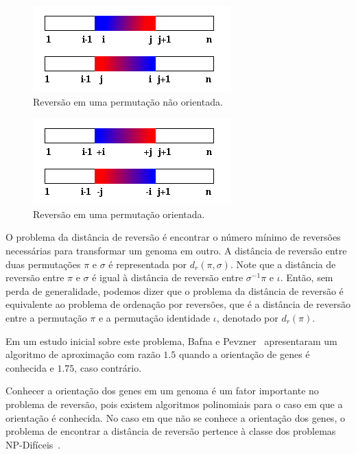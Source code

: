 \begin{figure}[h]
  \centering
  \includegraphics{images/rev_nao_orientada-color.png} 
  \caption{Reversão em uma permutação não orientada.}
  \label{fig:rev_nao_orientada}
\end{figure}

\begin{figure}[h]
  \centering
  \includegraphics{images/rev_orientada-color.png}
  \caption{Reversão em uma permutação orientada.}
  \label{fig:rev_orientada}
\end{figure}

O problema da distância de reversão é encontrar o número mínimo de
reversões necessárias para transformar um genoma em outro. A distância
de reversão entre duas permutações $\pi$ e $\sigma$ é representada por
$d_{r}(\pi,\sigma)$. Note que a distância de reversão entre $\pi$ e
$\sigma$ é igual à distância de reversão entre $\sigma^{-1} \pi$ e
$\iota$. Então, sem perda de generalidade, podemos dizer que o problema
da distância de reversão é equivalente ao problema de ordenação por
reversões, que é a distância de reversão entre a permutação $\pi$ e a
permutação identidade $\iota$, denotado por $d_{r}(\pi)$.

Em um estudo inicial sobre este problema, Bafna e
Pevzner~\cite{BafnaPevzner*1996} apresentaram um algoritmo de
aproximação com razão $1.5$ quando a orientação de genes é conhecida e
$1.75$, caso contrário.

Conhecer a orientação dos genes em um genoma é um fator importante no
problema de reversão, pois existem algoritmos polinomiais para o caso em
que a orientação é conhecida. No caso em que não se conhece a orientação
dos genes, o problema de encontrar a distância de reversão pertence à
classe dos problemas NP-Difíceis~\cite{Caprara*1997}.

